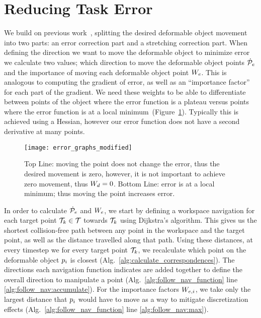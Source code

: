 \section{Reducing Task Error}
\label{sec:reducing_error}

We build on previous work~\cite{Berenson2013}, splitting the desired deformable object movement into two parts: an error correction part and a stretching correction part. When defining the direction we want to move the deformable object to minimize error we calculate two values; which direction to move the deformable object points $\dot{\mathcal{P}}_e$ and the importance of moving each deformable object point $W_e$. This is analogous to computing the gradient of error, as well as an ``importance factor'' for each part of the gradient. We need these weights to be able to differentiate between points of the object where the error function is a plateau versus points where the error function is at a local minimum~(Figure~\ref{fig:error_examples}). Typically this is achieved using a Hessian, however our error function does not have a second derivative at many points. 

\begin{figure}[h!]
    \centering
    \texttt{[image: error\_graphs\_modified]}
    \caption{Top Line: moving the point does not change the error, thus the desired movement is zero, however, it is not important to achieve zero movement, thus $W_d = 0$.  Bottom Line: error is at a local minimum; thus moving the point increases error.}
    \label{fig:error_examples}
\end{figure}

In order to calculate $\dot{\mathcal{P}}_e$ and $W_e$, we start by defining a workspace navigation for each target point $\mathcal{T}_k \in \mathcal{T}$ towards $\mathcal{T}_k$ using Dijkstra's algorithm. This gives us the shortest collision-free path between any point in the workspace and the target point, as well as the distance travelled along that path. Using these distances, at every timestep we for every target point $\mathcal{T}_k$, we recalculate which point on the deformable object $p_i$ is closest (Alg.~\ref{alg:calculate_correspondences}). The directions each navigation function indicates are added together to define the overall direction to manipulate a point (Alg.~\ref{alg:follow_nav_function} line \ref{alg:follow_nav:accumulate}). For the importance factors $W_{e,i}$, we take only the largest distance that $p_i$ would have to move as a way to mitigate discretization effects (Alg.~\ref{alg:follow_nav_function} line \ref{alg:follow_nav:max}).

